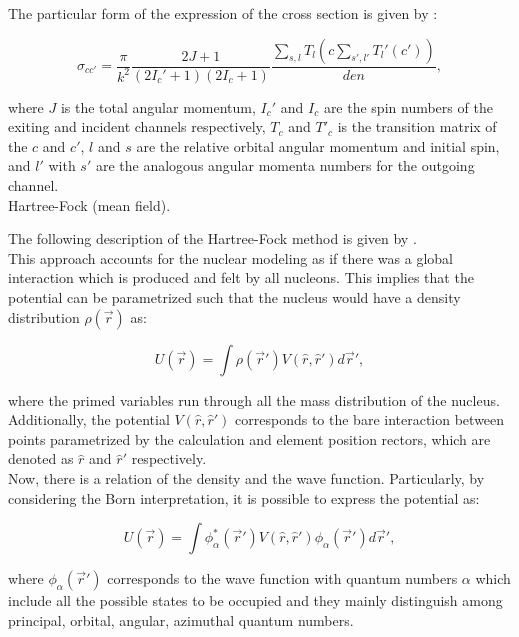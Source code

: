 \documentclass[openany]{book}
\begin{document}
The particular form of the expression of the cross section is given by \cite{bertulani_2003}: 


\begin{equation} \label{eq:micro_hauserFeshbach}
	\sigma_{cc'} = \frac{\pi}{k^2}  \frac{2J+1}{(2I_c' + 1) (2 I_c + 1)} \frac{\sum_{s, l} T_l(c \sum_{s', l ' } {T_l'(c')} ) }{den},
\end{equation}

where $J$ is the total angular momentum, $I_c'$ and $I_c$ are the spin numbers of the exiting and incident channels respectively, $T_c$ and $T'_c$ is the transition matrix of the $c$ and $c'$, $l$ and $s$ are the relative orbital angular momentum and initial spin, and $l'$ with $s'$ are the analogous angular momenta numbers for the outgoing channel. \\


Hartree-Fock (mean field).

The following description of the Hartree-Fock method is given by \cite{heyde_2020}.\\ 

This approach accounts for the nuclear modeling as if there was a global interaction which is produced and felt by all nucleons. This implies that the potential can be parametrized such that the nucleus would have a density distribution $\rho(\vec r)$ as:

\begin{equation}\label{eq:micro_hartreeFock_potential}
	U(\vec r) = \int \rho (\vec r') V(\hat r, \hat r') d \vec r ',
\end{equation}

where the primed variables run through all the mass distribution of the nucleus. Additionally, the potential $V(\hat r, \hat r')$ corresponds to the bare interaction between points parametrized by the calculation and element position rectors, which are denoted as $\hat r$ and $\hat r'$ respectively. \\

Now, there is a relation of the density and the wave function. Particularly, by considering the Born interpretation, it is possible to express the potential as: 

\begin{equation}\label{eq:micro_hartreeFock_potential_waveFunction}
	U(\vec r) = \int \phi_\alpha^{*} (\vec r')  V(\hat r, \hat r') \phi_\alpha(\vec r') d \vec r ',
\end{equation}

where $ \phi_\alpha(\vec r') $ corresponds to the wave function with quantum numbers $\alpha$ which include all the possible states to be occupied and they mainly distinguish among principal, orbital, angular, azimuthal quantum numbers. \\
\end{document}
